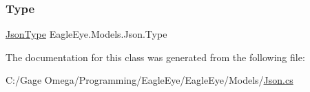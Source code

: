 \subsubsection{\texorpdfstring{Type}{Type}}
{\footnotesize\ttfamily \mbox{\hyperlink{class_eagle_eye_1_1_models_1_1_json_afdf0e16163f8b9bab5b45d6d01e8133c}{Json\+Type}} Eagle\+Eye.\+Models.\+Json.\+Type\hspace{0.3cm}{\ttfamily [get]}}



The documentation for this class was generated from the following file\+:\begin{DoxyCompactItemize}
\item 
C\+:/\+Gage Omega/\+Programming/\+Eagle\+Eye/\+Eagle\+Eye/\+Models/\mbox{\hyperlink{_json_8cs}{Json.\+cs}}\end{DoxyCompactItemize}

